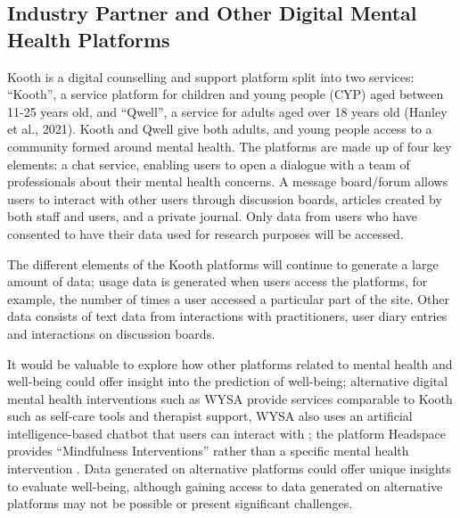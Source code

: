 \documentclass[12pt]{article}
\begin{document}
\subsection{Industry Partner and Other Digital Mental Health Platforms}
Kooth is a digital counselling and support platform split into two services: “Kooth”, a service platform for children and young people (CYP) aged between 11-25 years old, and “Qwell”, a service for adults aged over 18 years old (Hanley et al., 2021). Kooth and Qwell give both adults, and young people access to a community formed around mental health. The platforms are made up of four key elements: a chat service, enabling users to open a dialogue with a team of professionals about their mental health concerns. A message board/forum allows users to interact with other users through discussion boards, articles created by both staff and users, and a private journal. Only data from users who have consented to have their data used for research purposes will be accessed.

The different elements of the Kooth platforms will continue to generate a large amount of data; usage data is generated when users access the platforms, for example, the number of times a user accessed a particular part of the site. Other data consists of text data from interactions with practitioners, user diary entries and interactions on discussion boards.

It would be valuable to explore how other platforms related to mental health and well-being could offer insight into the prediction of well-being; alternative digital mental health interventions such as WYSA provide services comparable to Kooth such as self-care tools and therapist support, WYSA also uses an artificial intelligence-based chatbot that users can interact with \parencite{inkster_empathy-driven_2018}; the platform Headspace provides “Mindfulness Interventions” rather than a specific mental health intervention \parencite{zollars_effects_2019}. Data generated on alternative platforms could offer unique insights to evaluate well-being, although gaining access to data generated on alternative platforms may not be possible or present significant challenges.  
\end{document}
